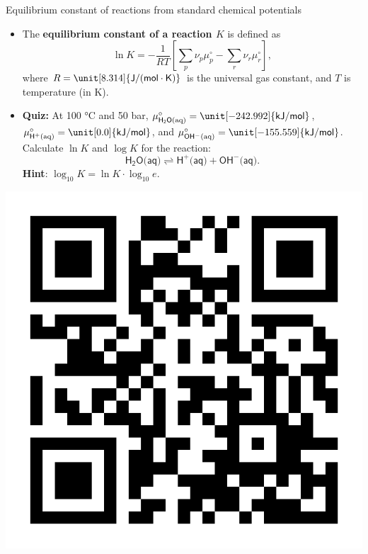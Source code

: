 %
%
%
\begin{frame}[<+->]{Equilibrium constant of reactions from standard chemical potentials}
\begin{itemize}
\item The \textbf{\alert{equilibrium constant of a reaction $K$}} is
defined as
\[
\boxed{
\ln K=-\frac{1}{RT}\left[\sum_{p}\nu_{p}\mu_{p}^{\circ}-\sum_{r}\nu_{r}\mu_{r}^{\circ}\right],
}
\]
where $R=\unit[8.314]{\mathsf{J/(mol\cdot K)}}$ is the universal
gas constant, and $T$ is temperature (in K). 
%
\vskip 10pt
\item \alert{\textbf{Quiz:}} At 100 °C and 50 bar, ${\mu_{\mathsf{H_{2}O\text{(aq)}}}^{\circ}=\unit[-242.992]{\mathsf{kJ/mol}}}$,
${\mu_{\mathsf{H^{+}\text{(aq)}}}^{\circ}=\unit[0.0]{\mathsf{kJ/mol}}}$,
and ${\mu_{\mathsf{OH^{-}\text{(aq)}}}^{\circ}=\unit[-155.559]{\mathsf{kJ/mol}}}$.
Calculate $\ln K$ and $\log K$ for the reaction:
\[
\mathsf{H_{2}O\text{(aq)}}\rightleftharpoons\mathsf{H^{+}\text{(aq)}+OH^{-}\text{(aq)}}.
\]
\textbf{Hint}: $\log_{10} K = \ln K \cdot \log_{10} e$.
\end{itemize}
\centering
\vskip -73pt
\includegraphics[height=0.22\columnwidth, right]{figures/chemical-equilibrium/poll-linear-independence.png}


\end{frame}
